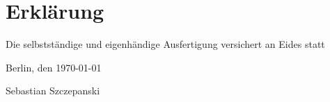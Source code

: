 \newpage
\section*{\vfill{} \thispagestyle{empty}
Erkl\"arung}
Die selbstst\"andige und eigenh\"andige Ausfertigung versichert an Eides
  statt\\

\bigskip{}

\noindent Berlin, den \today{}
\vspace{2.5cm}

\noindent Sebastian Szczepanski \cleardoublepage{}